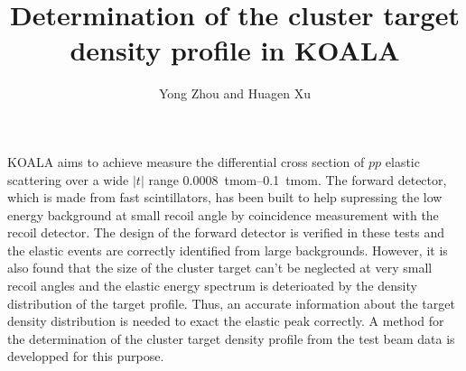 \documentclass[fleqn,twocolumn,a4paper]{ikpar}
\begin{document}
\parindent=0pt
\frenchspacing

\title{{\bf
    Determination of the cluster target density profile in KOALA
}}
\author{Yong Zhou
  and Huagen Xu
}

\maketitle

KOALA aims to achieve measure the differential cross section of $pp$ elastic
scattering over a wide $|t|$ range \SIrange{0.0008}{0.1}{tmom}.
The forward detector, which is made from fast scintillators, has been built to help
supressing the low energy background at small recoil angle by coincidence
measurement with the recoil detector.
The design of the forward detector is verified in these tests and the elastic
events are correctly identified from large backgrounds.
However, it is also found that the size of the cluster target can't be
neglected at very small recoil angles and the elastic energy spectrum is
deterioated by the density distribution of the target profile.
Thus, an accurate information about the target density distribution is needed to exact
the elastic peak correctly.
A method for the determination of the cluster target density profile from the
test beam data is developped for this purpose.
\par
\medskip
\end{document}
